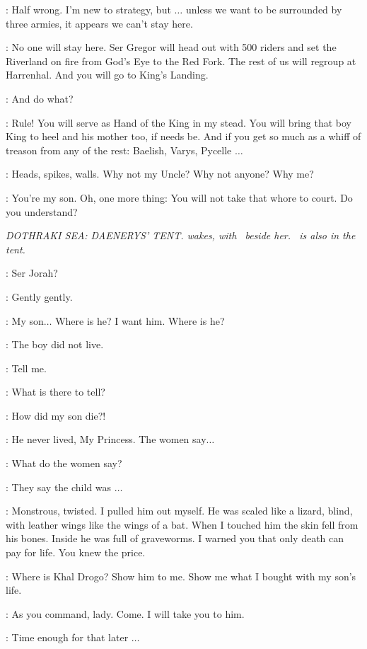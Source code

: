 \TYRION: Half wrong. I'm new to strategy, but $\ldots$ unless we want to be surrounded by three armies, it appears we can't stay here. 

\TYWIN: No one will stay here. Ser Gregor will head out with 500 riders and set the Riverland on fire from God's Eye to the Red Fork. The rest of us will regroup at Harrenhal. And you will go to King's Landing. 

\TYRION: And do what? 

\TYWIN: Rule! You will serve as Hand of the King in my stead. You will bring that boy King to heel and his mother too, if needs be. And if you get so much as a whiff of treason from any of the rest: Baelish, Varys, Pycelle $\ldots$  

\TYRION: Heads, spikes, walls. Why not my Uncle? Why not anyone? Why me? 

\TYWIN: You're my son. Oh, one more thing: You will not take that whore to court. Do you understand? 


\scene

\textit{DOTHRAKI SEA: DAENERYS' TENT.  \DAENERYS wakes, with \JORAH ~beside her.  \MIRRI ~is also in the tent.} 

\DAENERYS: Ser Jorah? 

\JORAH: Gently gently. 

\DAENERYS: My son$\ldots$ Where is he? I want him. Where is he? 

\JORAH: The boy did not live. 

\DAENERYS: Tell me. 

\JORAH: What is there to tell? 

\DAENERYS: How did my son die?! 

\JORAH: He never lived, My Princess. The women say$\ldots$ 

\DAENERYS: What do the women say? 

\JORAH: They say the child was $\ldots$  

\MIRRI: Monstrous, twisted. I pulled him out myself. He was scaled like a lizard, blind, with leather wings like the wings of a bat. When I touched him the skin fell from his bones. Inside he was full of graveworms. I warned you that only death can pay for life. You knew the price. 

\DAENERYS: Where is Khal Drogo? Show him to me. Show me what I bought with my son's life. 

\MIRRI: As you command, lady. Come. I will take you to him. 

\JORAH: Time enough for that later $\ldots$  

